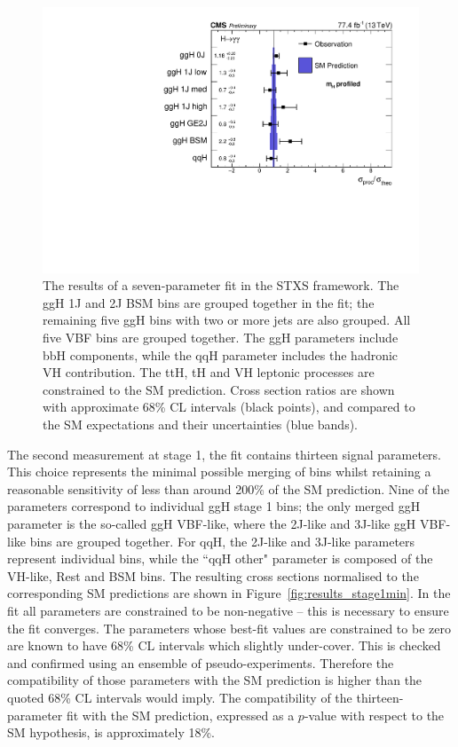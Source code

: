 \begin{figure}[hptb]
\centering
\includegraphics[width=\textwidth]{Figures/Results/Stage1.pdf}
\caption{
  The results of a seven-parameter fit in the STXS framework. 
  The ggH 1J and 2J BSM bins are grouped together in the fit; 
  the remaining five ggH bins with two or more jets are also grouped. 
  All five VBF bins are grouped together. 
  The ggH parameters include bbH components, 
  while the qqH parameter includes the hadronic VH contribution. 
  The ttH, tH and VH leptonic processes are constrained to the SM prediction. 
  Cross section ratios are shown with approximate 68\% CL intervals (black points), 
  and compared to the SM expectations and their uncertainties (blue bands).
}
\label{fig:results_stage1}
\end{figure}

The second measurement at stage 1, the fit contains thirteen signal parameters.
This choice represents the minimal possible merging of bins 
whilst retaining a reasonable sensitivity of less than around 200\% of the SM prediction.
Nine of the parameters correspond to individual ggH stage 1 bins; 
the only merged ggH parameter is the so-called ggH VBF-like, 
where the 2J-like and 3J-like ggH VBF-like bins are grouped together.
For qqH, the 2J-like and 3J-like parameters represent individual bins, 
while the ``qqH other" parameter is composed of the VH-like, Rest and BSM bins.
The resulting cross sections normalised to the corresponding SM predictions 
are shown in Figure~\ref{fig:results_stage1min}.
In the fit all parameters are constrained to be non-negative -- this is necessary 
to ensure the fit converges.
The parameters whose best-fit values are constrained to be zero are known to have 68\% CL intervals 
which slightly under-cover. 
This is checked and confirmed using an ensemble of pseudo-experiments.
Therefore the compatibility of those parameters with the SM prediction is higher than 
the quoted 68\% CL intervals would imply.
The compatibility of the thirteen-parameter fit with the SM prediction, 
expressed as a $p$-value with respect to the SM hypothesis, is approximately 18\%.

